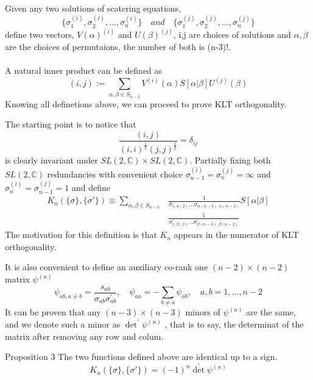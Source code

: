 \documentclass{beamer}
\begin{document}
\begin{frame}
    Given any two solutions of scatering equations,
    \begin{equation*}
        \{\sigma_1^{(i)},\sigma_2^{(i)},\dots,\sigma_n^{(i)}\}\quad and \quad \{\sigma_1^{(j)},\sigma_2^{(j)},\dots,\sigma_n^{(j)}\}
    \end{equation*}
    define two vectors, $V(\alpha)^{(i)}$ and $U(\beta)^{(j)}$, i,j are choices of solutions and $\alpha,\beta$ are the choices of permutaions,
    the number of both is \alert{(n-3)!}.
    \\ \hspace*{\fill}\\
    A natural inner product can be defined as
    \begin{equation*}
        (i,j):=\sum_{\alpha,\beta\in S_{n-3}}V^{(i)}(\alpha)S[\alpha|\beta]U^{(j)}(\beta)
    \end{equation*}
    Knowing all definetions above, we can proceed to prove KLT orthogonality.
\end{frame}
\begin{frame}
    The starting point is to notice that
    \begin{equation*}
        \frac{(i,j)}{(i,i)^{\frac12}(j,j)^{\frac12}}=\delta_{ij}
    \end{equation*}
    is clearly invariant under $SL(2,\mathbb{C})\times SL(2,\mathbb{C})$. Partially fixing both $SL(2,\mathbb{C})$
    redundancies with convenient choice $\sigma_{n-1}^{(i)}=\sigma_n^{(j)}=\infty$ and $\sigma_n^{(i)}=\sigma_{n-1}^{(j)}=1$
    and define 
    \begin{align*}
            K_n(\{\sigma\},\{\sigma'\})\equiv\sum_{\alpha,\beta\in S_{n-3}}&\frac1{\sigma_{1,\alpha(2)}\ldots\sigma_{\alpha(n-3),\alpha(n-2)}}S[\alpha|\beta]\\
            &\frac1{\sigma_{1,\beta(2)}^{\prime}\ldots\sigma_{\beta(n-3),\beta(n-2)}^{\prime}}
    \end{align*}
    The motivation for this definition is that $K_n$ appears in the numerator of KLT orthogonality.
\end{frame}
\begin{frame}
    It is also convenient to define an auxiliary co-rank one $(n-2)\times(n-2)$ matrix $\psi^{(n)}$
    \begin{equation*}
        \psi_{ab,a\neq b}=\frac{s_{ab}}{\sigma_{ab}\sigma_{ab}^{\prime}},\quad\psi_{aa}=-\sum_{b\neq a}\psi_{ab},\quad a,b=1,\ldots,n{-}2
    \end{equation*}
    It can be proven that any $(n-3)\times(n-3)$ minors of $\psi^{(n)}$ are the same, and we denote such a minor as
    ${\det}^\prime\psi^{(n)}$ , that is to say, the determinat of the matrix after removing any row and colum.
    \begin{block}{Proposition 3}
        The two functions defined above are identical up to a sign.
        \begin{equation*}
            K_n(\{\sigma\},\{\sigma'\})=(-1)^n{\det}^\prime\psi^{(n)}
        \end{equation*}
    \end{block}
\end{frame}
\end{document}

